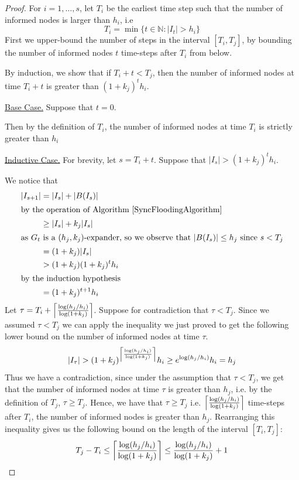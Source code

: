 \begin{proof}
	For $i = 1,\dots, s$, let $T_i$ be the earliest time step such that the number of informed nodes is larger than $h_i$, i.e
	$$
		T_i = \min \{ t \in \mathbb{N} : |I_t| > h_i \}
	$$
	First we upper-bound the number of steps in the interval $[T_i, T_j]$,
	by bounding the number of informed nodes $t$ time-steps after $T_i$ from below.

	By induction, we show that if $T_i + t < T_j$, then the number of informed nodes at time $T_i + t$ is greater than $(1+k_j)^t h_i$.
	
	\underline{Base Case.} Suppose that $t=0$. 
	
	Then by the definition of $T_i$, the number of informed nodes at time $T_i$ is strictly greater than $h_i$

	\underline{Inductive Case.} For brevity, let $s = T_i + t$. Suppose that $|I_s| > (1+k_j)^t h_i$.

	We notice that 
	\begin{align*}\label{}
		|I_{s+1}| &= |I_s| + |B(I_s)| \\
		\intertext{by the operation of Algorithm \ref{SyncFloodingAlgorithm}}
		& \geq |I_s| + k_j |I_s| \\ 
		\intertext{as $G_t$ is a $(h_j, k_j)$-expander, so we observe that $|B(I_s)| \leq h_j$ since $s < T_j$}
		& = (1 + k_j)|I_s| \\
		& > (1 + k_j)(1+k_j)^t h_i \\
		\intertext{by the induction hypothesis}
		& = (1+k_j)^{t+1} h_i
	\end{align*}
	Let $\tau = T_i + \ceil*{ \frac{\log (h_j/h_i)}{\log(1+k_j)}}$. 
	Suppose for contradiction that $\tau < T_j$.
	Since we assumed $\tau < T_j$ we can apply the inequality we just proved
	to get the following lower bound on the number of informed nodes at time $\tau$.
	$$
		|I_\tau| > 
		(1+k_j)^{\ceil*{ \frac{\log (h_j/h_i)}{\log(1+k_j)}}} h_i
		\geq e^{\log (h_j/h_i)} h_i
		= h_j
	$$
	Thus we have a contradiction, since under the assumption that $\tau < T_j$, we get that the number of informed nodes at time $\tau$ is greater than $h_j$, i.e. by the definition of $T_j$, $\tau \geq T_j$. Hence, we have that $\tau \geq T_j$ i.e. $\ceil*{ \frac{\log (h_j/h_i)}{\log(1+k_j)}}$ time-steps after $T_i$, the number of informed nodes is greater than $h_j$. Rearranging this inequality gives us the following bound on the length of the interval $[T_i, T_j]$:
	\begin{equation} \label{eq:FloodingIntervalBound}
		T_j - T_i \leq \ceil*{ \frac{\log (h_j/h_i)}{\log(1+k_j)}} \leq \frac{\log (h_j/h_i)}{\log(1+k_j)} + 1
	\end{equation}


\end{proof}
